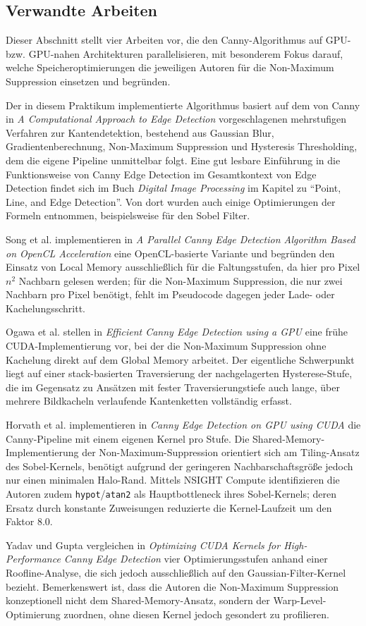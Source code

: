 \subsection{Verwandte Arbeiten}
\label{subsec:related-work}
Dieser Abschnitt stellt vier Arbeiten vor, die den Canny-Algorithmus auf
GPU- bzw. GPU-nahen Architekturen parallelisieren, mit besonderem Fokus
darauf, welche Speicheroptimierungen die jeweiligen Autoren für die
Non-Maximum Suppression einsetzen und begründen.

Der in diesem Praktikum implementierte Algorithmus basiert auf dem von
Canny \cite{canny1986} in \textit{A Computational Approach to Edge
Detection} vorgeschlagenen mehrstufigen Verfahren zur Kantendetektion,
bestehend aus Gaussian Blur, Gradientenberechnung, Non-Maximum
Suppression und Hysteresis Thresholding, dem die eigene Pipeline
unmittelbar folgt. Eine gut lesbare Einführung in die Funktionsweise von 
Canny Edge Detection im Gesamtkontext von Edge Detection findet sich im Buch \textit{Digital Image Processing} 
\cite[S. 729ff.]{gonzalez_digital_2018} im Kapitel zu \enquote{Point, Line, and Edge Detection}.
Von dort wurden auch einige Optimierungen der Formeln entnommen, beispielsweise für den Sobel Filter.

Song et al. \cite{song2024} implementieren in \textit{A Parallel Canny
Edge Detection Algorithm Based on OpenCL Acceleration} eine
OpenCL-basierte Variante und begründen den Einsatz von Local Memory
ausschließlich für die Faltungsstufen, da hier pro Pixel $n^2$ Nachbarn
gelesen werden; für die Non-Maximum Suppression, die nur zwei Nachbarn
pro Pixel benötigt, fehlt im Pseudocode dagegen jeder Lade- oder
Kachelungsschritt.

Ogawa et al. \cite{ogawa2010} stellen in \textit{Efficient Canny Edge
Detection using a GPU} eine frühe CUDA-Implementierung vor, bei der die
Non-Maximum Suppression ohne Kachelung direkt auf dem Global Memory
arbeitet. Der eigentliche Schwerpunkt liegt auf einer stack-basierten
Traversierung der nachgelagerten Hysterese-Stufe, die im Gegensatz zu
Ansätzen mit fester Traversierungstiefe auch lange, über mehrere
Bildkacheln verlaufende Kantenketten vollständig erfasst.

Horvath et al. \cite{horvath2023} implementieren in \textit{Canny Edge
Detection on GPU using CUDA} die Canny-Pipeline mit einem eigenen Kernel
pro Stufe. Die Shared-Memory-Implementierung der Non-Maximum-Suppression
orientiert sich am Tiling-Ansatz des Sobel-Kernels, benötigt aufgrund
der geringeren Nachbarschaftsgröße jedoch nur einen minimalen Halo-Rand.
Mittels NSIGHT Compute identifizieren die Autoren zudem
\texttt{hypot}/\texttt{atan2} als Hauptbottleneck ihres Sobel-Kernels;
deren Ersatz durch konstante Zuweisungen reduzierte die Kernel-Laufzeit
um den Faktor 8.0.

Yadav und Gupta \cite{yadav2025} vergleichen in \textit{Optimizing CUDA
Kernels for High-Performance Canny Edge Detection} vier
Optimierungsstufen anhand einer Roofline-Analyse, die sich jedoch
ausschließlich auf den Gaussian-Filter-Kernel bezieht. Bemerkenswert
ist, dass die Autoren die Non-Maximum Suppression konzeptionell nicht
dem Shared-Memory-Ansatz, sondern der Warp-Level-Optimierung zuordnen,
ohne diesen Kernel jedoch gesondert zu profilieren.